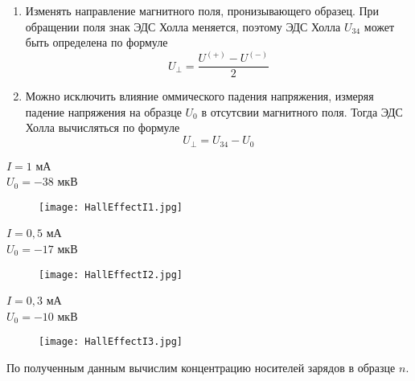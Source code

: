     \begin{enumerate}
        \item Изменять направление магнитного поля, пронизывающего образец. При обращении поля знак
        ЭДС Холла меняется, поэтому ЭДС Холла $U_{34}$ может быть определена по формуле
        \begin{equation*}
            U_{\bot} = \frac{U^{(+)} - U^{(-)}}{2}
        \end{equation*}
        \item Можно исключить влияние оммического падения напряжения, измеряя падение напряжения на образце $U_0$
        в отсутсвии магнитного поля. Тогда ЭДС Холла вычисляться по формуле
        \begin{equation*}
            U_{\bot} = U_{34} - U_0
        \end{equation*}
    \end{enumerate}

    \newpage
    \begin{center}
        $I = 1$    мА  \\
        $U_0 = -38$ мкВ \\
    \end{center}
    
    \begin{figure}[h!]
        \centering
        \texttt{[image: HallEffectI1.jpg]}
        \caption{}
    \end{figure}
    \newpage
    \begin{center}
        $I = 0,5$    мА  \\
        $U_0 = -17$ мкВ \\
    \end{center}
    
    \begin{figure}[h!]
        \centering
        \texttt{[image: HallEffectI2.jpg]}
        \caption{}
    \end{figure}
    \newpage
    \begin{center}
        $I = 0,3$    мА  \\
        $U_0 = -10$ мкВ \\
    \end{center}
    
    \begin{figure}[h!]
        \centering
        \texttt{[image: HallEffectI3.jpg]}
        \caption{}
    \end{figure}
    \noindent По полученным данным вычислим концентрацию носителей зарядов в образце $n$.

